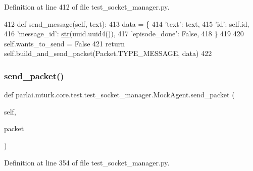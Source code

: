 Definition at line 412 of file test\+\_\+socket\+\_\+manager.\+py.


\begin{DoxyCode}
412     \textcolor{keyword}{def }send\_message(self, text):
413         data = \{
414             \textcolor{stringliteral}{'text'}: text,
415             \textcolor{stringliteral}{'id'}: self.id,
416             \textcolor{stringliteral}{'message\_id'}: \hyperlink{namespacegenerate__task__READMEs_a5b88452ffb87b78c8c85ececebafc09f}{str}(uuid.uuid4()),
417             \textcolor{stringliteral}{'episode\_done'}: \textcolor{keyword}{False},
418         \}
419 
420         self.wants\_to\_send = \textcolor{keyword}{False}
421         \textcolor{keywordflow}{return} self.build\_and\_send\_packet(Packet.TYPE\_MESSAGE, data)
422 
\end{DoxyCode}
\mbox{\label{classparlai_1_1mturk_1_1core_1_1test_1_1test__socket__manager_1_1MockAgent_a8093cf5f5ce398010769e21ab23e2859}} 
\subsubsection{\texorpdfstring{send\+\_\+packet()}{send\_packet()}}
{\footnotesize\ttfamily def parlai.\+mturk.\+core.\+test.\+test\+\_\+socket\+\_\+manager.\+Mock\+Agent.\+send\+\_\+packet (\begin{DoxyParamCaption}\item[{}]{self,  }\item[{}]{packet }\end{DoxyParamCaption})}



Definition at line 354 of file test\+\_\+socket\+\_\+manager.\+py.


